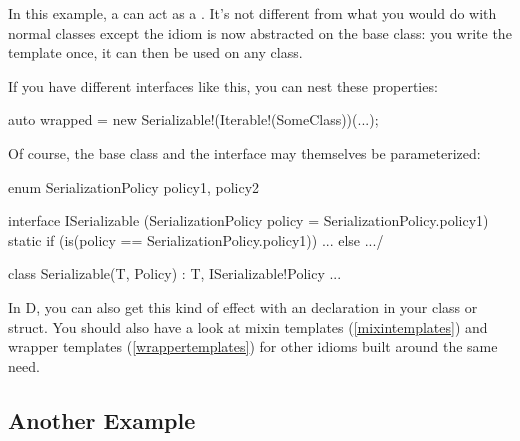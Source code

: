 In this example, a  can act as a . It's not different from what you would do with normal classes except the idiom is now abstracted on the base class: you write the template once, it can then be used on any class.

If you have different interfaces like this, you can nest these properties:

\begin{dcode}
auto wrapped = new Serializable!(Iterable!(SomeClass))(...);
\end{dcode}

Of course, the base class and the interface may themselves be parameterized:

\begin{dcode}
enum SerializationPolicy { policy1, policy2 }

interface ISerializable
(SerializationPolicy policy = SerializationPolicy.policy1)
{
    static if (is(policy == SerializationPolicy.policy1))
        ...
    else
        .../
}

class Serializable(T, Policy) : T, ISerializable!Policy
{
    ...
} 
\end{dcode}

In D, you can also get this kind of effect with an  declaration in your class or struct. You should also have a look at mixin templates (\ref{mixintemplates}) and wrapper templates (\ref{wrappertemplates}) for other idioms built around the same need. 

\subsection{Another Example}


